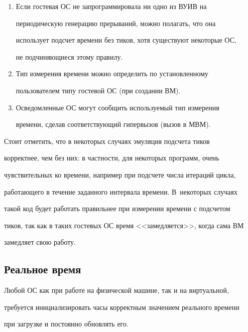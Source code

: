      \begin{enumerate}[1.]


\item Если гостевая ОС не запрограммировала ни одно из ВУИВ на 


периодическую генерацию прерываний, можно полагать, что она 


использует подсчет времени без тиков, хотя существуют некоторые ОС, 


не подчиняющиеся этому правилу.


\item Тип измерения времени можно определить по установленному 


пользователем типу гостевой ОС (при создании ВМ).


\item Осведомленные ОС могут сообщить используемый тип измерения 


времени, сделав соответствующий гипервызов (вызов в МВМ).


\end{enumerate}


     


     Стоит отметить, что в некоторых случаях эмуляция подсчета тиков 


корректнее, чем без них: в частности, для некоторых программ, очень 


чувствительных ко времени, например при подсчете числа итераций цикла, 


работающего в течение заданного интервала времени. В~некоторых случаях 


такой код будет работать правильнее при измерении времени с подсчетом 


тиков, так как в таких гостевых ОС время <<замедляется>>, когда сама ВМ 


замедляет свою работу.





\subsection{Реальное время} %





     Любой ОС как при работе на физической машине, так и на виртуальной, 


требуется инициализировать часы корректным значением реального времени 


при загрузке и постоянно обновлять его.


